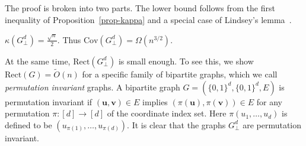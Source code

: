 \documentclass[submission]{llncs}
\def\Cov{{\mathrm{Cov}}}
\def\Rect{{\mathrm{Rect}}}
\def\bs#1{{\boldsymbol{#1}}}
\begin{document}
  The proof is broken into two parts. The lower bound follows from the first inequality of Proposition~\ref{prop-kappa}
  and a special case of Lindsey's lemma~\cite{DBLP:books/daglib/0028687}.
  \begin{proposition}
  \label{prop-bot-cov}
  $\kappa(G^d_\bot)=\frac{\sqrt{n}}{2}$. Thus $\Cov(G^d_\bot)=\Omega(n^{3/2})$.
  \end{proposition}
At the same time, $\Rect(G^d_\bot)$ is small enough.
To see this, we show $\Rect(G)=\tilde{O}(n)$ for a specific family of bipartite graphs, which we call \emph{permutation invariant} graphs.
  A bipartite graph $G=(\{0,1\}^d,\{0,1\}^d,E)$ is permutation invariant if $(\bs{u},\bs{v})\in E$ implies $(\pi(\bs{u}),\pi(\bs{v}))\in E$
  for any permutation $\pi:[d]\to[d]$ of the coordinate index set. Here $\pi(u_1,\ldots,u_d)$ is defined to be $(u_{\pi(1)},\ldots,u_{\pi(d)})$.
  It is clear that the graphs $G_\bot^d$ are permutation invariant.
\end{document}
